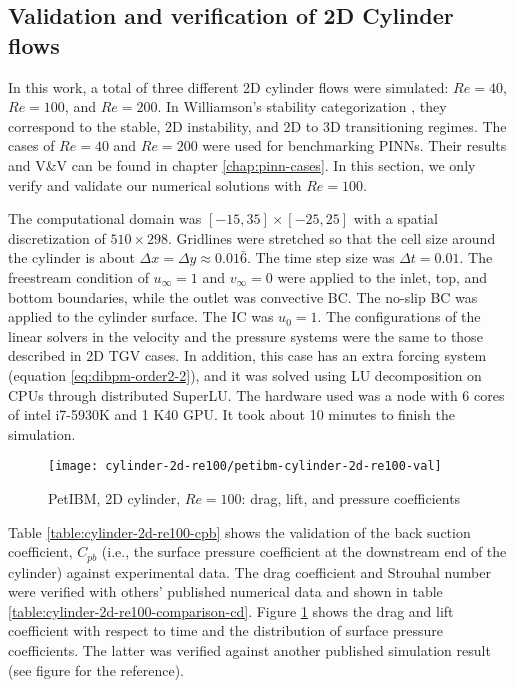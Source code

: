 \subsection*{Validation and verification of 2D Cylinder flows}

In this work, a total of three different 2D cylinder flows were simulated: $Re=40$, $Re=100$, and $Re=200$.
In Williamson's stability categorization \cite{williamson_vortex_1996}, they correspond to the stable, 2D instability, and 2D to 3D transitioning regimes.
The cases of $Re=40$ and $Re=200$ were used for benchmarking PINNs.
Their results and V\&V can be found in chapter \ref{chap:pinn-cases}.
In this section, we only verify and validate our numerical solutions with $Re=100$.

The computational domain was $[-15, 35]\times[-25, 25]$ with a spatial discretization of $510 \times 298$.
Gridlines were stretched so that the cell size around the cylinder is about $\Delta x = \Delta y \approx 0.01\bar{6}$.
The time step size was $\Delta t = 0.01$.
The freestream condition of $u_{\infty}=1$ and $v_{\infty}=0$ were applied to the inlet, top, and bottom boundaries, while the outlet was convective BC.
The no-slip BC was applied to the cylinder surface.
The IC was $u_0=1$.
The configurations of the linear solvers in the velocity and the pressure systems were the same to those described in 2D TGV cases.
In addition, this case has an extra forcing system (equation \eqref{eq:dibpm-order2-2}), and it was solved using LU decomposition on CPUs through distributed SuperLU.
The hardware used was a node with 6 cores of intel i7-5930K and 1 K40 GPU.
It took about 10 minutes to finish the simulation.



\begin{figure}[hbt!]
    \texttt{[image: cylinder-2d-re100/petibm-cylinder-2d-re100-val]}
    \caption{PetIBM, 2D cylinder, $Re=100$: drag, lift, and pressure coefficients}
    \label{fig:petibm-cylinder-2d-re100-val}
\end{figure}

Table \ref{table:cylinder-2d-re100-cpb} shows the validation of the back suction coefficient, $C_{pb}$ (i.e., the surface pressure coefficient at the downstream end of the cylinder) against experimental data.
The drag coefficient and Strouhal number were verified with others' published numerical data and shown in table \ref{table:cylinder-2d-re100-comparison-cd}.
Figure \ref{fig:petibm-cylinder-2d-re100-val} shows the drag and lift coefficient with respect to time and the distribution of surface pressure coefficients.
The latter was verified against another published simulation result (see figure for the reference).


